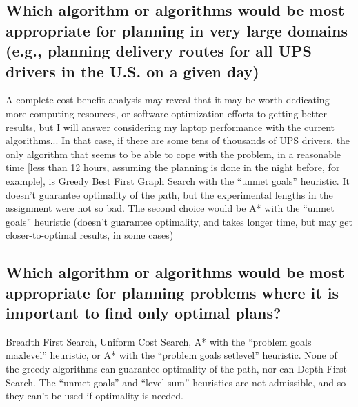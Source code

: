 \documentclass[a4paper,12pt]{article}
\begin{document}
\subsection{Which algorithm or algorithms would be most appropriate for planning in very large domains (e.g., planning delivery routes for all UPS drivers in the U.S. on a given day)}
A complete cost-benefit analysis may reveal that it may be worth dedicating more computing resources, or software optimization efforts to getting better results, but I will answer considering my laptop performance with the current algorithms... In that case, if there are some tens of thousands of UPS drivers, the only algorithm that seems to be able to cope with the problem, in a reasonable time [less than 12 hours, assuming the planning is done in the night before, for example], is Greedy Best First Graph Search with the ``unmet goals'' heuristic. It doesn't guarantee optimality of the path, but the experimental lengths in the assignment were not so bad. The second choice would be A* with the ``unmet goals'' heuristic (doesn't guarantee optimality, and takes longer time, but may get closer-to-optimal results, in some cases)


\subsection{Which algorithm or algorithms would be most appropriate for planning problems where it is important to find only optimal plans? }
Breadth First Search, Uniform Cost Search, A* with the ``problem goals maxlevel'' heuristic, or A* with the ``problem goals setlevel'' heuristic. None of the greedy algorithms can guarantee optimality of the path, nor can Depth First Search. The ``unmet goals'' and ``level sum'' heuristics are not admissible, and so they can't be used if optimality is needed.
\end{document}
